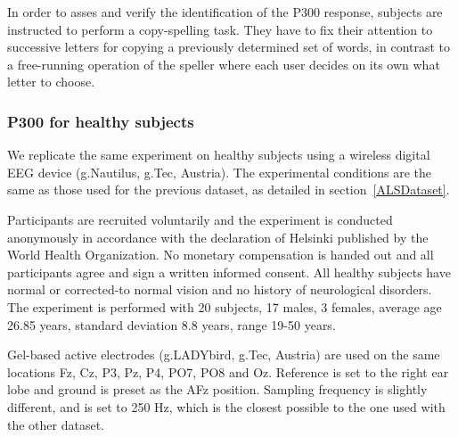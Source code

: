 \documentclass[entropy,article,submit,moreauthors,pdftex,10pt,a4paper]{mdpi}
\begin{document}
In order to asses and verify the identification of the P300 response, subjects are instructed to perform a copy-spelling task. They have to fix their attention to successive letters for copying a previously determined set of words, in contrast to a free-running operation of the speller where each user decides on its own what letter to choose.

\subsubsection{P300 for healthy subjects}

We replicate the same experiment on healthy subjects using a wireless digital EEG device (g.Nautilus, g.Tec, Austria).  The experimental conditions are the same as those used for the previous dataset, as detailed in section~\ref{ALSDataset}.

Participants are recruited voluntarily and the experiment is conducted anonymously in accordance with the declaration of Helsinki published by the World Health Organization.  No monetary compensation is handed out and all participants agree and sign a written informed consent.  All healthy subjects have normal or corrected-to normal vision and no history of neurological disorders. The experiment is performed with 20 subjects, 17 males, 3 females, average age 26.85 years, standard deviation  8.8 years, range 19-50 years.

Gel-based active electrodes (g.LADYbird, g.Tec, Austria) are used on the same locations Fz, Cz, P3, Pz, P4, PO7, PO8 and Oz.  Reference is set to the right ear lobe and ground is preset as the AFz position.   Sampling frequency is slightly different, and is set to 250 Hz, which is the closest possible to the one used with the other dataset.


\end{document}
